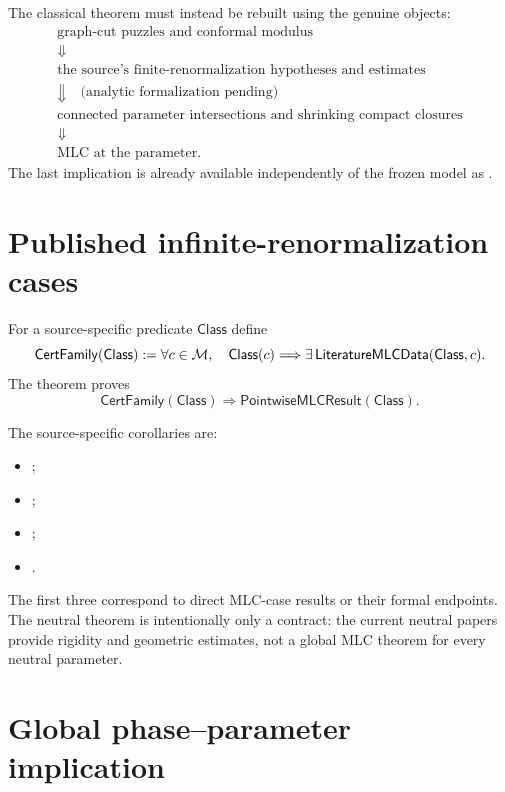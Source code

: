 \begin{conditionalstep}
The classical theorem must instead be rebuilt using the genuine
objects:
\[
\begin{gathered}
\text{graph-cut puzzles and conformal modulus}\\
\Downarrow\\
\text{the source's finite-renormalization hypotheses and estimates}\\
\Downarrow\quad\text{(analytic formalization pending)}\\
\text{connected parameter intersections and shrinking compact closures}\\
\Downarrow\\
\text{MLC at the parameter}.
\end{gathered}
\]
The last implication is already available independently of the frozen
model as .
\end{conditionalstep}

\section{Published infinite-renormalization cases}

For a source-specific predicate $\mathsf{Class}$ define
\[
\mathsf{CertFamily}(\mathsf{Class})
:=
\forall c\in\mathcal M,\quad
\mathsf{Class}(c)\Longrightarrow
\exists\,\mathsf{LiteratureMLCData}(\mathsf{Class},c).
\]
The theorem
 proves
\[
\mathsf{CertFamily}(\mathsf{Class})
\Longrightarrow
\mathsf{PointwiseMLCResult}(\mathsf{Class}).
\]

The source-specific corollaries are:
\begin{itemize}
\item {};
\item {};
\item {};
\item {}.
\end{itemize}
The first three correspond to direct MLC-case results or their formal
endpoints.  The neutral theorem is intentionally only a contract: the
current neutral papers provide rigidity and geometric estimates, not a
global MLC theorem for every neutral parameter.

\section{Global phase--parameter implication}

